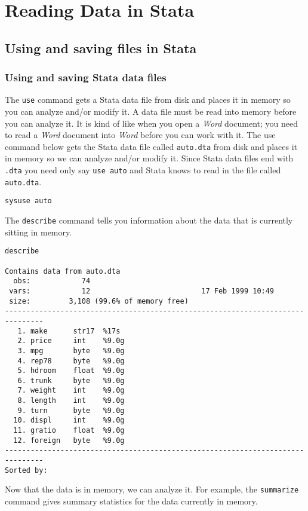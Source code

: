 \section{Reading Data in Stata}
\subsection{Using and saving files in Stata}
\subsubsection{Using and saving Stata data files}

The \lstinline{use} command gets a Stata data file from disk and places it in memory so you can analyze and/or modify it. A data file must be read into memory before you can analyze it. It is kind of like when you open a \textit{Word} document; you need to read a \textit{Word} document into \textit{Word} before you can work with it. The use command below gets the Stata data file called \lstinline{auto.dta} from disk and places it in memory so we can analyze and/or modify it. Since Stata data files end with \lstinline{.dta} you need only say \lstinline{use auto} and Stata knows to read in the file called \lstinline{auto.dta}.

\begin{lstlisting}
sysuse auto
\end{lstlisting}

The \lstinline{describe} command tells you information about the data that is currently sitting in memory.

\begin{lstlisting}
describe

Contains data from auto.dta
  obs:            74
 vars:            12                          17 Feb 1999 10:49
 size:         3,108 (99.6% of memory free)
-------------------------------------------------------------------------------
   1. make      str17  %17s
   2. price     int    %9.0g
   3. mpg       byte   %9.0g
   4. rep78     byte   %9.0g
   5. hdroom    float  %9.0g
   6. trunk     byte   %9.0g
   7. weight    int    %9.0g
   8. length    int    %9.0g
   9. turn      byte   %9.0g
  10. displ     int    %9.0g
  11. gratio    float  %9.0g
  12. foreign   byte   %9.0g
-------------------------------------------------------------------------------
Sorted by:
\end{lstlisting}

Now that the data is in memory, we can analyze it. For example, the \lstinline{summarize} command gives summary statistics for the data currently in memory.

